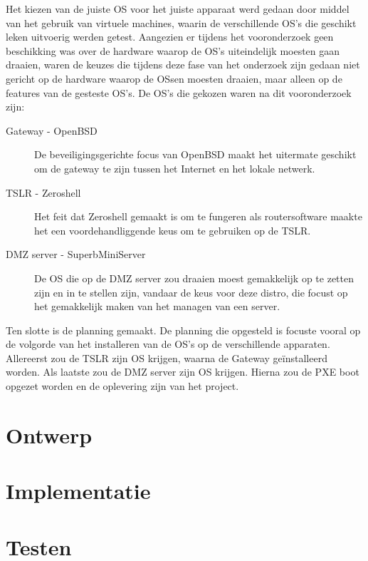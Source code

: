 \documentclass[12pt]{article}
\begin{document}
Het kiezen van de juiste OS voor het juiste apparaat werd gedaan door middel van het gebruik van virtuele machines, waarin de verschillende OS's die geschikt leken uitvoerig werden getest. Aangezien er tijdens het vooronderzoek geen beschikking was over de hardware waarop de OS's uiteindelijk moesten gaan draaien, waren de keuzes die tijdens deze fase van het onderzoek zijn gedaan niet gericht op de hardware waarop de OSsen moesten draaien, maar alleen op de features van de gesteste OS's. De OS's die gekozen waren na dit vooronderzoek zijn:
\begin{description}
\item[Gateway - OpenBSD] De beveiligingsgerichte focus van OpenBSD maakt het uitermate geschikt om de gateway te zijn tussen het Internet en het lokale netwerk.
\item[TSLR - Zeroshell] Het feit dat Zeroshell gemaakt is om te fungeren als routersoftware maakte het een voordehandliggende keus om te gebruiken op de TSLR.
\item[DMZ server - SuperbMiniServer] De OS die op de DMZ server zou draaien moest gemakkelijk op te zetten zijn en in te stellen zijn, vandaar de keus voor deze distro, die focust op het gemakkelijk maken van het managen van een server.
\end{description}
Ten slotte is de planning gemaakt. De planning die opgesteld is focuste vooral op de volgorde van het installeren van de OS's op de verschillende apparaten. Allereerst zou de TSLR zijn OS krijgen, waarna de Gateway ge\"installeerd worden. Als laatste zou de DMZ server zijn OS krijgen. Hierna zou de PXE boot opgezet worden en de oplevering zijn van het project.
\section{Ontwerp}
\section{Implementatie}
\section{Testen}
\end{document}
